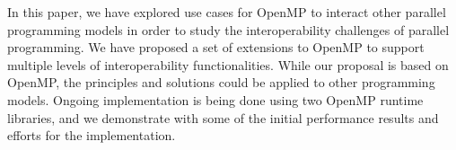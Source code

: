 In this paper, we have explored use cases for OpenMP to interact other parallel programming models
in order to study the interoperability challenges of parallel programming. 
We have proposed a set of extensions to OpenMP to support multiple levels of interoperability functionalities. While our proposal is based 
on OpenMP, the principles and solutions could be applied to other programming models. 
Ongoing implementation is being done using two OpenMP runtime libraries, and we demonstrate with 
some of the initial performance results and efforts for the implementation. %
\begin{comment}
One feature is 
that allowing the user to create a new OpenMP thread and assign a task to it instead 
of creating new user thread. We have implement a function to allow users to get one 
thread from the existing thread pool is any threads are available, and assign one task 
to this thread, this helps to take advantage of the OpenMP thread pool and won’t need 
to create a new thread to work on it, which helps to save the memory usage and speed up the runtime.

We have studied the waiting policy of the OpenMP and how the current OpenMP Runtime System deals with the thread pool. Considering there are two waiting policies, one called throughput (passive), which is designed to make the program aware of its environment (that is, the system load) and to adjust its resource usage to produce efficient execution in a dynamic environment. While the other one called turnaround (active), which is designed to keep active all of the processors involved in the parallel computation in order to minimize the execution time of a single job. We cannot simply say which one is better than the other, it depends one the executing environment. When setting the wait policy to be passive, after a certain period of time has elapsed, the useless thread will stop waiting and sleep. Thus active mode may be better for high-density of OpenMP tasks. While, a passive mode with a small blocktime value may offer better overall performance if your application contains non-OpenMP threaded code that executes between parallel regions. 

In addition, we have implemented a new function to shutdown the whole runtime library when exiting the parallel region. Since all threads are maintained in the same thread pool, quiesce will reap every threads to free the memory, which sometimes help to clear the runtime environment when the task density is lower and we don’t need to wake up most of the thread in the thread pool. However, when entering new parallel regions, we need to make sure that we register the current working thread as our root thread, so that new runtime environment can be built on it. It cost time to restart another parallel region, thus works slower when lots of tasks in the task queue.
\end{comment}

